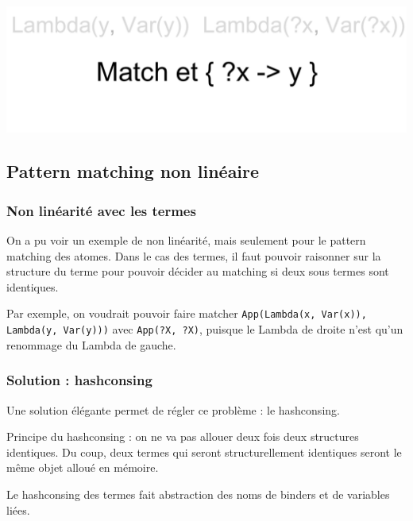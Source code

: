 \begin{frame}
\begin{center}
      {\includegraphics[scale=0.5]{pattern/atom5.pdf}}

\end{center}


\end{frame}

\subsection{Pattern matching non linéaire}

\begin{frame}
\frametitle{Non linéarité avec les termes}

On a pu voir un exemple de non linéarité, mais seulement pour le pattern
matching des atomes. Dans le cas des termes, il faut pouvoir raisonner sur la
structure du terme pour pouvoir décider au matching si deux sous termes sont
identiques.

\bigskip

Par exemple, on voudrait pouvoir faire matcher 
\texttt{App(Lambda(x, Var(x)), Lambda(y, Var(y)))} avec 
\texttt{App(?X, ?X)}, puisque le Lambda de droite n'est qu'un renommage du
Lambda de gauche.

\end{frame}

\begin{frame}
\frametitle{Solution : hashconsing}

Une solution élégante permet de régler ce problème : le hashconsing. 

Principe du hashconsing : on ne va pas allouer deux fois deux structures
identiques. Du coup, deux termes qui seront structurellement identiques seront
le même objet alloué en mémoire.

\bigskip

Le hashconsing des termes fait abstraction des noms de binders et de variables
liées.

\end{frame}

